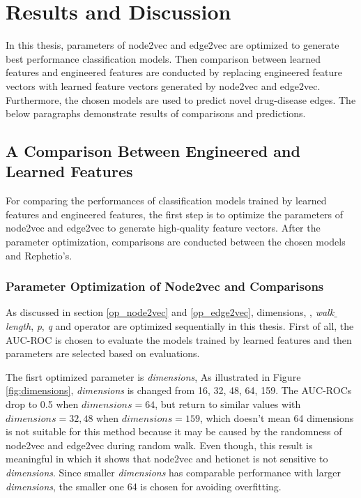 \chapter{Results and Discussion}
\label{results}

In this thesis, parameters of node2vec and edge2vec are optimized to generate best performance classification models. Then comparison between learned features and engineered features are conducted by replacing engineered feature vectors with learned feature vectors generated by node2vec and edge2vec. Furthermore, the chosen models are used to predict novel drug-disease edges. The below paragraphs demonstrate results of comparisons and predictions.

\section{A Comparison Between Engineered and Learned Features}

For comparing the performances of classification models trained by learned features and engineered features, the first step is to optimize the parameters of node2vec and edge2vec to generate high-quality feature vectors. After the parameter optimization, comparisons are conducted between the chosen models and Rephetio's. 


\subsection{Parameter Optimization of Node2vec and Comparisons}

As discussed in section \ref{op_node2vec} and \ref{op_edge2vec}, dimensions, , \textit{walk$\_$length}, \textit{p}, \textit{q} and operator are optimized sequentially in this thesis. First of all, the \ac{AUC-ROC} is chosen to evaluate the models trained by learned features and then parameters are selected based on evaluations.

The fisrt optimized parameter is \textit{dimensions}, As illustrated in Figure \ref{fig:dimensions}, \textit{dimensions} is changed from 16, 32, 48, 64, 159. The \ac{AUC-ROC}s drop to 0.5 when $dimensions = 64$, but return to similar values with $dimensions = 32, 48$ when $dimensions = 159$, which doesn't mean 64 dimensions is not suitable for this method because it may be caused by the randomness of node2vec and edge2vec during random walk. Even though, this result is meaningful in which it shows that node2vec and hetionet is not sensitive to \textit{dimensions}. Since smaller \textit{dimensions} has comparable performance with larger \textit{dimensions}, the smaller one 64 is chosen for avoiding overfitting.

